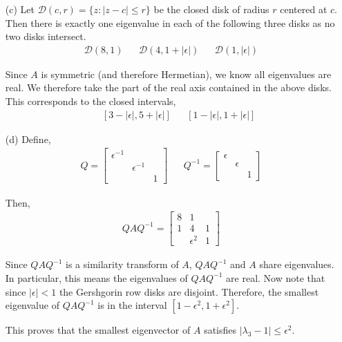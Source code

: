\documentclass[10pt]{article}
\begin{document}
\begin{solution}[Solution]
\begin{enumerate}
    \item[(c)] Let \( \mathcal{D}(c,r) = \{z : |z-c|\leq r\} \) be the closed disk of radius \( r \) centered at \( c \). Then there is exactly one eigenvalue in each of the following three disks as no two disks intersect.
        \begin{align*}
            \mathcal{D}(8,1) && \mathcal{D}(4,1+|\epsilon|) && \mathcal{D}(1,|\epsilon|)    
        \end{align*}

        Since \( A \) is symmetric (and therefore Hermetian), we know all eigenvalues are real. We therefore take the part of the real axis contained in the above disks. This corresponds to the closed intervals,
        \begin{align*}
            [7,9] && [3-|\epsilon|,5+|\epsilon|] && [1-|\epsilon|,1+|\epsilon|]
        \end{align*}
    
    \item[(d)]
        Define,
        \begin{align*}
            Q=
            \left[\begin{array}{rrr}
                \epsilon^{-1} & \\
                & \epsilon^{-1} \\
                & & 1
            \end{array}\right]
            && Q^{-1} =
            \left[\begin{array}{rrr}
                \epsilon\\
                & \epsilon\\
                & & 1
            \end{array}\right]
        \end{align*}

        Then,
        \begin{align*}
            QAQ^{-1} = 
            \left[\begin{array}{rrr}
                8 & 1  \\
                1 & 4 & 1 \\
                & \epsilon^2 & 1
            \end{array}\right]
        \end{align*}

        
        Since \( QAQ^{-1} \) is a similarity transform of \( A \), \( QAQ^{-1} \) and \( A \) share eigenvalues. In particular, this means the eigenvalues of \( QAQ^{-1} \) are real.  
                Now note that since \( |\epsilon|<1 \) the Gershgorin row disks are disjoint. Therefore, the smallest eigenvalue of \( QAQ^{-1} \) is in the interval \( [1-\epsilon^2,1+\epsilon^2] \).
        
        This proves that the smallest eigenvector of \( A \) satisfies \( |\lambda_3-1|\leq \epsilon^2 \).

\end{enumerate}
\end{solution}
\end{document}
